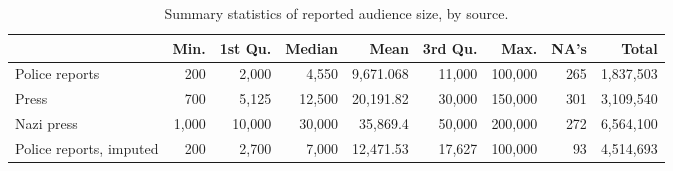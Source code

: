\begin{table}[t!]
\centering
\caption{Summary statistics of reported audience size, by source.\label{tab:audiencesumstats}} 
\begingroup\small
\begin{tabular}{lrrrrrrrr}
  \toprule
 & Min. & 1st Qu. & Median & Mean & 3rd Qu. & Max. & NA's & Total \\ 
  \midrule
Police reports & 200 & 2,000 & 4,550 & 9,671.068 & 11,000 & 100,000 & 265 & 1,837,503 \\ 
  Press & 700 & 5,125 & 12,500 & 20,191.82 & 30,000 & 150,000 & 301 & 3,109,540 \\ 
  Nazi press & 1,000 & 10,000 & 30,000 & 35,869.4 & 50,000 & 200,000 & 272 & 6,564,100 \\ 
   \midrule
Police reports, imputed & 200 & 2,700 & 7,000 & 12,471.53 & 17,627 & 100,000 & 93 & 4,514,693 \\ 
   \bottomrule
\end{tabular}
\endgroup
\end{table}
